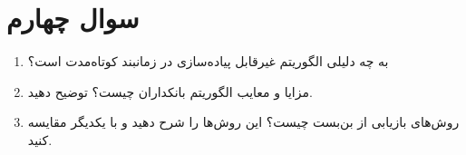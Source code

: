 \section{سوال چهارم}

\begin{enumerate}
	\item 
	به چه دلیلی الگوریتم  غیرقابل پیاده‌سازی در زمانبند کوتاه‌مدت است؟
	
	
	
	\item 
	مزایا و معایب الگوریتم بانکداران چیست؟ توضیح دهید.
	
	
	\item 
	روش‌های بازیابی از بن‌بست چیست؟ این روش‌ها را شرح دهید و با یکدیگر مقایسه کنید.
\end{enumerate}